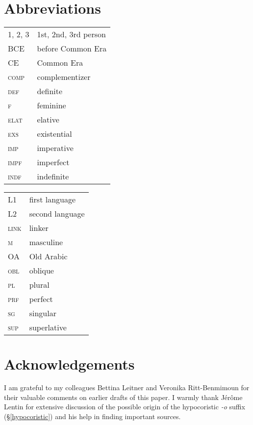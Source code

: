 \documentclass[output=paper]{langsci/langscibook}
\begin{document}
\section*{Abbreviations}

\begin{tabularx}{.45\textwidth}{lQ}
\textsc{1, 2, 3} & 1st, 2nd, 3rd person \\
BCE & before Common Era \\
CE & Common Era \\
\textsc{comp} & complementizer \\
\textsc{def} & definite \\
\textsc{f} & feminine \\
\textsc{elat} & elative \\
\textsc{exs} & existential \\
\textsc{imp} & imperative \\
\textsc{impf} & imperfect \\
\textsc{indf} & indefinite \\
\end{tabularx}
\begin{tabularx}{.45\textwidth}{lQ}
L1 & first language \\
L2 & second language \\
\textsc{link} & linker \\
\textsc{m} & masculine \\
OA & Old Arabic \\
\textsc{obl} & oblique \\
\textsc{pl} & plural \\
\textsc{prf} & perfect \\
\textsc{sg} & singular \\
\textsc{sup} & superlative \\
\end{tabularx}


\section*{Acknowledgements}
I am grateful to my colleagues Bettina Leitner and Veronika Ritt-Benmimoun for their valuable comments on earlier drafts of this paper. I warmly thank Jérôme Lentin for extensive discussion of the possible origin of the hypocoristic \textit{-o} suffix (§\ref{hypocoristic}) and his help in finding important sources. 

\sloppy
\printbibliography[heading=subbibliography,notkeyword=this] 
\end{document}
